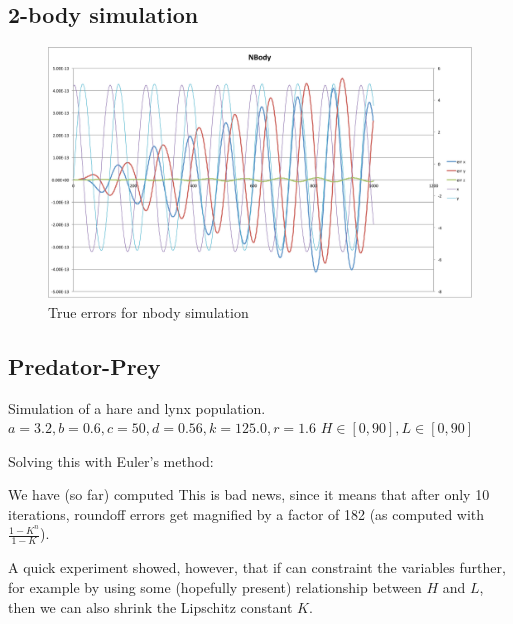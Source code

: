 \documentclass[10pt]{article}
\begin{document}
\subsection{2-body simulation}
\begin{figure}[h!]
  \centering
\includegraphics[width=\textwidth]{images/nbody}
  \caption{True errors for nbody simulation}
\label{fig:2body}
\end{figure}

\subsection{Predator-Prey}
Simulation of a hare and lynx population.
$a = 3.2, b = 0.6, c = 50, d = 0.56, k = 125.0, r = 1.6$
$H \in [0, 90], L \in [0, 90]$

Solving this with Euler's method:

We have (so far) computed
This is bad news, since it means that after only 10 iterations, roundoff errors
get magnified by a factor of 182 (as computed with $\frac{1-K^n}{1-K}$).

A quick experiment showed, however, that if can constraint the variables further,
for example by using some (hopefully present) relationship between $H$ and $L$,
then we can also shrink the Lipschitz constant $K$.
\end{document}
